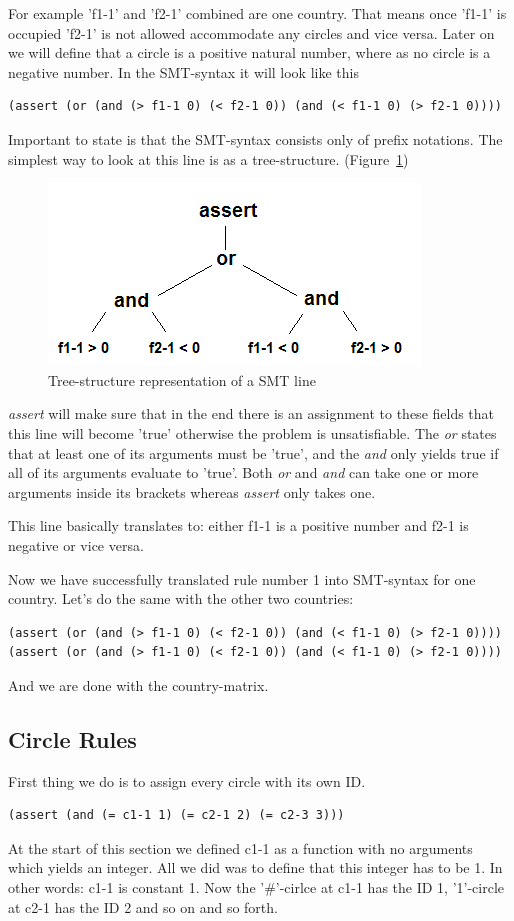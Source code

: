 For example 'f1-1' and 'f2-1' combined are one country. That means once 'f1-1' is occupied 'f2-1' is not allowed accommodate any circles and vice versa. Later on we will define that a circle is a positive natural number, where as no circle is a negative number. In the SMT-syntax it will look like this
\begin{lstlisting}
(assert (or (and (> f1-1 0) (< f2-1 0)) (and (< f1-1 0) (> f2-1 0))))
\end{lstlisting}
Important to state is that the SMT-syntax consists only of prefix notations. The simplest way to look at this line is as a tree-structure. (Figure~\ref{fig:tree_structure})
\begin{figure}
  \centering
  \includegraphics[scale=1]{Pictures/tree_structure.png} 
  \caption{Tree-structure representation of a SMT line}
  \label{fig:tree_structure}
\end{figure}

\emph{assert} will make sure that in the end there is an assignment to these fields that this line will become 'true' otherwise the problem is unsatisfiable. The \emph{or} states that at least one of its arguments must be 'true', and the \emph{and} only yields true if all of its arguments evaluate to 'true'. Both \emph{or} and \emph{and} can take one or more arguments inside its brackets whereas \emph{assert} only takes one.

This line basically translates to: either f1-1 is a positive number and f2-1 is negative or vice versa.

Now we have successfully translated rule number 1 into SMT-syntax for one country. Let's do the same with the other two countries:
\begin{lstlisting}
(assert (or (and (> f1-1 0) (< f2-1 0)) (and (< f1-1 0) (> f2-1 0))))
(assert (or (and (> f1-1 0) (< f2-1 0)) (and (< f1-1 0) (> f2-1 0))))
\end{lstlisting}
And we are done with the country-matrix.

\subsection{Circle Rules}
First thing we do is to assign every circle with its own ID.
\begin{lstlisting}
(assert (and (= c1-1 1) (= c2-1 2) (= c2-3 3)))
\end{lstlisting}
At the start of this section we defined c1-1 as a function with no arguments which yields an integer. All we did was to define that this integer has to be 1. In other words: c1-1 is constant 1.
Now the '\#'-cirlce at c1-1 has the ID 1, '1'-circle at c2-1 has the ID 2 and so on and so forth.

